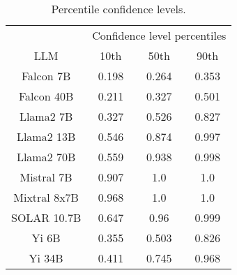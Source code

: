 \begin{table*}
\centering
\begin{tabular}{c|c|c|c}
& \multicolumn{3}{c}{Confidence level percentiles} \\ 
LLM & 10th & 50th & 90th\\ \hline
Falcon 7B & 0.198 & 0.264 & 0.353\\
Falcon 40B & 0.211 & 0.327 & 0.501\\
Llama2 7B & 0.327 & 0.526 & 0.827\\
Llama2 13B & 0.546 & 0.874 & 0.997\\
Llama2 70B & 0.559 & 0.938 & 0.998\\
Mistral 7B & 0.907 & 1.0 & 1.0\\
Mixtral 8x7B & 0.968 & 1.0 & 1.0\\
SOLAR 10.7B & 0.647 & 0.96 & 0.999\\
Yi 6B & 0.355 & 0.503 & 0.826\\
Yi 34B & 0.411 & 0.745 & 0.968\\
\hline
\end{tabular}
\caption{Percentile confidence levels.}
\label{tab:percentile_conf}
\end{table*}
